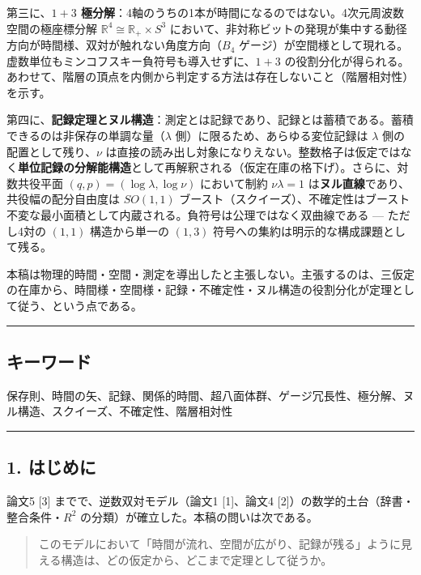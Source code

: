 \documentclass[
]{ltjsarticle}
\begin{document}
第三に、\textbf{\(1{+}3\)
極分解}：4軸のうちの1本が時間になるのではない。4次元周波数空間の極座標分解
\(\mathbb{R}^4\cong\mathbb{R}_+\times S^3\)
において、非対称ビットの発現が集中する動径方向が時間様、双対が触れない角度方向（\(B_4\)
ゲージ）が空間様として現れる。虚数単位もミンコフスキー負符号も導入せずに、\(1{+}3\)
の役割分化が得られる。あわせて、階層の頂点を内側から判定する方法は存在しないこと（階層相対性）を示す。

第四に、\textbf{記録定理とヌル構造}：測定とは記録であり、記録とは蓄積である。蓄積できるのは非保存の単調な量（\(\lambda\)
側）に限るため、あらゆる変位記録は \(\lambda\)
側の配置として残り、\(\nu\)
は直接の読み出し対象になりえない。整数格子は仮定ではなく\textbf{単位記録の分解能構造}として再解釈される（仮定在庫の格下げ）。さらに、対数共役平面
\((q,p)=(\log\lambda,\log\nu)\) において制約 \(\nu\lambda=1\)
は\textbf{ヌル直線}であり、共役幅の配分自由度は \(SO(1,1)\)
ブースト（スクイーズ）、不確定性はブースト不変な最小面積として内蔵される。負符号は公理ではなく双曲線である
--- ただし4対の \((1,1)\) 構造から単一の \((1,3)\)
符号への集約は明示的な構成課題として残る。

本稿は物理的時間・空間・測定を導出したと主張しない。主張するのは、三仮定の在庫から、時間様・空間様・記録・不確定性・ヌル構造の役割分化が定理として従う、という点である。

\begin{center}\rule{0.5\linewidth}{0.5pt}\end{center}

\subsection{キーワード}\label{ux30adux30fcux30efux30fcux30c9}

保存則、時間の矢、記録、関係的時間、超八面体群、ゲージ冗長性、極分解、ヌル構造、スクイーズ、不確定性、階層相対性

\begin{center}\rule{0.5\linewidth}{0.5pt}\end{center}

\subsection{1. はじめに}\label{ux306fux3058ux3081ux306b}

論文5 {[}3{]} までで、逆数双対モデル（論文1 {[}1{]}、論文4
{[}2{]}）の数学的土台（辞書・整合条件・\(R^2\)
の分類）が確立した。本稿の問いは次である。

\begin{quote}
このモデルにおいて「時間が流れ、空間が広がり、記録が残る」ように見える構造は、どの仮定から、どこまで定理として従うか。
\end{quote}
\end{document}
